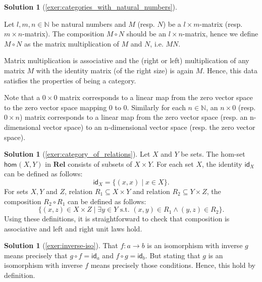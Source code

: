 \documentclass[a4paper,11pt, oneside,titlepage=false]{scrbook}
\theoremstyle{plain}
\theoremstyle{definition}
\newtheorem{solution}[thm]{Solution}
\newcommand{\cfont}[1]{\ensuremath{\mathsf{#1}}}
\newcommand{\Catb}[1]{\mathbf{#1}}
\newcommand{\REL}{\Catb{Rel}}
\newcommand{\Hom}[3][]{\cfont{hom}_{#1}(#2,#3)}
\newcommand{\Id}[1][]{\cfont{id}_{#1}}
\newcommand{\co}[2]{\ensuremath{#2 \circ #1}}
\newcommand{\NN}{\ensuremath{\mathbb{N}}}
\begin{document}
\begin{solution}[\cref{exer:categories_with_natural_numbers}]
\begin{enumerate}
Let $l,m,n \in\NN$ be natural numbers and $M$ (resp. $N$) be a $l\times m$-matrix (resp. $m\times n$-matrix). The composition $\co{N}{M}$ should be an $l\times n$-matrix, hence we define $\co{N}{M}$ as the matrix multiplication of $M$ and $N$, i.e. $MN$.

Matrix multiplication is associative and the (right or left) multiplication of any matrix $M$ with the identity matrix (of the right size) is again $M$. Hence, this data satisfies the properties of being a category.

Note that a $0 \times 0$ matrix corresponds to a linear map from the zero vector space to the zero vector space mapping $0$ to $0$.
Similarly for each $n \in \NN$, an $n \times 0$ (resp. $0 \times n$) matrix corresponds to a linear map from the zero vector space (resp. an n-dimensional vector space) to an n-dimensional vector space (resp. the zero vector space).

\end{enumerate}
\end{solution}

\begin{solution}[\cref{exer:category_of_relations}] \label{sol:category_of_relations}
Let $X$ and $Y$ be sets. The hom-set $\Hom X Y$ in $\REL$ consists of subsets of $X \times Y$. For each set $X$, the identity $\Id[X]$ can be defined as follows:
\[ \Id[X] = \{ (x,x) \mid x \in X \} .\]
For sets $X,Y$ and $Z$, relation $R_1 \subseteq X \times Y$ and relation $R_2 \subseteq Y \times Z$, the composition $R_2 \circ R_1$ can be defined as follows:
\[ \{ (x,z) \in X \times Z \mid \exists y \in Y \text{ s.t. } (x,y) \in R_1 \wedge (y,z) \in R_2 \} . \]
Using these definitions, it is straightforward to check that composition is associative and left and right unit laws hold.
\end{solution}

\begin{solution}[\cref{exer:inverse-iso}]\label{sol:inverse-iso}
That $f:a\to b$ is an isomorphism with inverse $g$ means precisely that $\co{f}{g} = \Id[a]$ and $\co{g}{f} = \Id[b]$. But stating that $g$ is an isomorphism with inverse $f$ means precisely those conditions. Hence, this hold by definition.
\end{solution}
\end{document}
